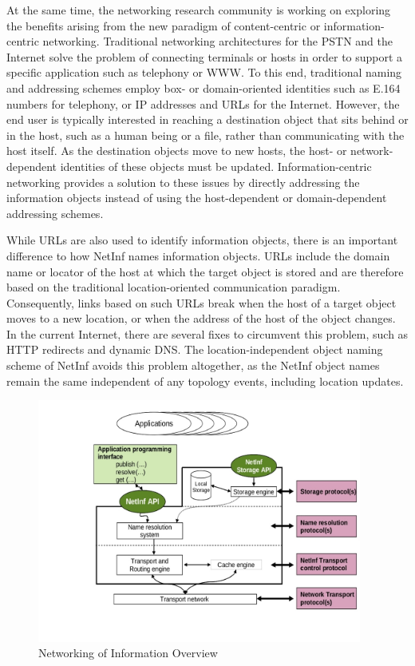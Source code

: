 At the same time, the networking research community is
working on exploring the benefits arising from the new
paradigm of content-centric or information-centric
networking. Traditional networking architectures for the
PSTN and the Internet solve the problem of connecting
terminals or hosts in order to support a specific application
such as telephony or WWW. To this end, traditional naming
and addressing schemes employ box- or domain-oriented
identities such as E.164 numbers for telephony, or IP
addresses and URLs for the Internet. However, the end user
is typically interested in reaching a destination object that
sits behind or in the host, such as a human being or a file,
rather than communicating with the host itself. As the
destination objects move to new hosts, the host- or network-dependent identities of these objects must be updated.
Information-centric networking provides a solution to these
issues by directly addressing the information objects instead
of using the host-dependent or domain-dependent addressing
schemes.

While URLs are also used to identify information
objects, there is an important difference to how NetInf names
information objects. URLs include the domain name or
locator of the host at which the target object is stored and are
therefore based on the traditional location-oriented
communication paradigm. Consequently, links based on such
URLs break when the host of a target object moves to a new
location, or when the address of the host of the object
changes. In the current Internet, there are several fixes to
circumvent this problem, such as HTTP redirects and
dynamic DNS. The location-independent object naming
scheme of NetInf avoids this problem altogether, as the
NetInf object names remain the same independent of any
topology events, including location updates.

\begin{figure}[h]
\begin{center}
\includegraphics[height=8cm]{2.jpg}
\caption{Networking of Information Overview}
\end{center}
\end{figure}

